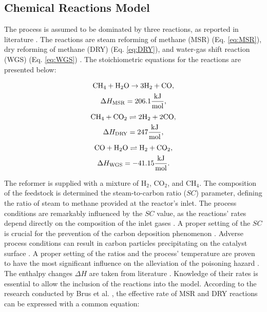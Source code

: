 \documentclass[preprint,12pt]{elsarticle}
\begin{document}
\subsection{Chemical Reactions Model}
\label{subsec:math_model_ref}

The process is assumed to be dominated by three reactions, as reported in literature \cite{Xu1989, Komatsu2009, Mozdzierz2018}. The reactions are steam reforming of methane (MSR) (Eq. \eqref{eq:MSR}), dry reforming of methane (DRY) (Eq. \eqref{eq:DRY}), and water-gas shift reaction (WGS) (Eq. \eqref{eq:WGS}) \cite{Brus2015}. The stoichiometric equations for the reactions are presented below: 

\begin{multline}
\label{eq:MSR}
\hfill \rm{CH_{4}+H_2O \rightarrow	3H_2+CO}, \hfill\\
{\Delta H_{\rm{MSR}} = 206.1 \rm{\frac{kJ}{mol}},}
\end{multline}
\begin{multline}
\label{eq:DRY}
\hfill \rm{CH_4+CO_2 \rightleftharpoons 2H_2+2CO}, \hfill\\
{\Delta H_{\rm{DRY}} = 247 \rm{\frac{kJ}{mol}},}
\end{multline}
\begin{multline}
\label{eq:WGS}
\hfill \rm{CO+H_2O \rightleftharpoons H_2+CO_2}, \hfill\\
{\Delta H_{\rm{WGS}} = -41.15 \rm{\frac{kJ}{mol}}.}
\end{multline}

 The reformer is supplied with a mixture of H$_2$, CO$_2$, and CH$_4$. The composition of the feedstock is determined the steam-to-carbon ratio ($SC$) parameter, defining the ratio of steam to methane provided at the reactor's inlet. The process conditions are remarkably influenced by the $SC$ value, as the reactions' rates depend directly on the composition of the inlet gases \cite{Usman2015}. A proper setting of the $SC$ is crucial for the prevention of the carbon deposition phenomenon \cite{Koncewicz2021}. Adverse process conditions can result in carbon particles precipitating on the catalyst surface \cite{Kaczmarczyk2021}. A proper setting of the ratios and the process' temperature are proven to have the most significant influence on the alleviation of the poisoning hazard \cite{Tomiczek2017}. The enthalpy changes $\Delta H$ are taken from literature \cite{Pajak2018, Mazhar2021}. Knowledge of their rates is essential to allow the inclusion of the reactions into the model. According to the research conducted by Brus et al. \cite{Brus2012}, the effective rate of MSR and DRY reactions can be expressed with a common equation:
\end{document}
